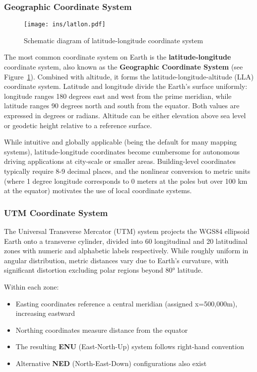\subsubsection{Geographic Coordinate System}
\begin{figure}
	\centering
	\texttt{[image: ins/latlon.pdf]}
	\caption{Schematic diagram of latitude-longitude coordinate system}
	\label{fig:latlon}
\end{figure}

The most common coordinate system on Earth is the \textbf{latitude-longitude} coordinate system, also known as the \textbf{Geographic Coordinate System} (see Figure~\ref{fig:latlon}). Combined with altitude, it forms the latitude-longitude-altitude (LLA) coordinate system. Latitude and longitude divide the Earth's surface uniformly: longitude ranges 180 degrees east and west from the prime meridian, while latitude ranges 90 degrees north and south from the equator. Both values are expressed in degrees or radians. Altitude can be either elevation above sea level or geodetic height relative to a reference surface.

While intuitive and globally applicable (being the default for many mapping systems), latitude-longitude coordinates become cumbersome for autonomous driving applications at city-scale or smaller areas. Building-level coordinates typically require 8-9 decimal places, and the nonlinear conversion to metric units (where 1 degree longitude corresponds to 0 meters at the poles but over 100 km at the equator) motivates the use of local coordinate systems.

\subsubsection{UTM Coordinate System}
The Universal Transverse Mercator (UTM) system projects the WGS84 ellipsoid Earth onto a transverse cylinder, divided into 60 longitudinal and 20 latitudinal zones with numeric and alphabetic labels respectively. While roughly uniform in angular distribution, metric distances vary due to Earth's curvature, with significant distortion excluding polar regions beyond 80° latitude.

Within each zone:
\begin{itemize}
	\item Easting coordinates reference a central meridian (assigned x=500,000m), increasing eastward
	\item Northing coordinates measure distance from the equator
	\item The resulting \textbf{ENU} (East-North-Up) system follows right-hand convention
	\item Alternative \textbf{NED} (North-East-Down) configurations also exist
\end{itemize}

